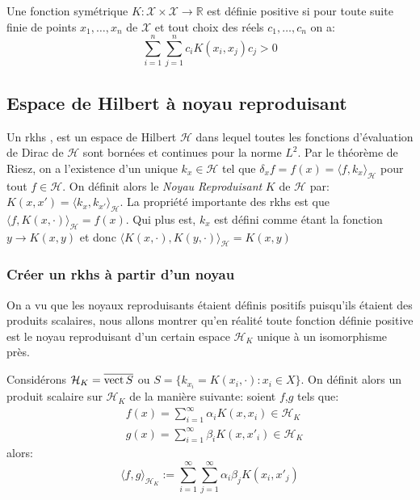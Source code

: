 \begin{definition}
Une fonction symétrique $K : \mathcal{X} \times \mathcal{X} \rightarrow \mathbb{R} $ est définie positive si pour toute suite finie de points $x_1,\dots,x_n$ de $\mathcal{X}$ et tout choix des réels $c_1,\dots, c_n$ on a:
\begin{equation*}
    \sum_{i=1}^n \sum_{j=1}^n c_i K(x_i,x_j) c_j > 0
\end{equation*}
\end{definition}

\subsection{Espace de Hilbert à noyau reproduisant}

Un \ac{rkhs} \citep{Aronszajn1950}, est un espace de Hilbert $\mathcal{H}$ dans lequel toutes les fonctions d'évaluation de Dirac de $\mathcal{H}$ sont bornées et continues pour la norme $L^2$. Par le théorème de Riesz, on a l'existence d'un unique $k_x \in \mathcal{H}$ tel que $\delta_x f = f(x) = \langle f, k_x \rangle_{\mathcal{H}}$ pour tout $f \in \mathcal{H}$. On définit alors le \textit{Noyau Reproduisant} $K$ de $\mathcal{H}$ par: $ K(x,x') = \langle k_x , k_{x'} \rangle_{\mathcal{H}} $. La propriété importante des \ac{rkhs} est que $ \langle f , K(x,\cdot) \rangle_{\mathcal{H}} = f(x)$. Qui plus est, $k_x$ est défini comme étant la fonction $ y \rightarrow K(x,y) $ et donc $ \langle K(x,\cdot), K(y,\cdot) \rangle_{\mathcal{H}} = K(x,y) $

\subsubsection{Créer un \ac{rkhs} à partir d'un noyau}

On a vu que les noyaux reproduisants étaient définis positifs puisqu'ils étaient des produits scalaires, nous allons montrer qu'en réalité toute fonction définie positive est le noyau reproduisant d'un certain espace $\mathcal{H}_K$ unique à un isomorphisme près.

Considérons $\mathcal{H}_K = \overline{\operatorname{vect} S} $ ou $ S = \{ k_{x_i} = K(x_i,\cdot) : x_i \in X \} $. On définit alors un produit scalaire sur $\mathcal{H}_K$ de la manière suivante: soient $f$,$g$ tels que:
\begin{align*}
    &f(x) = \sum_{i=1}^\infty \alpha_i K(x,x_i) \in \mathcal{H}_K \\
    &g(x) = \sum_{i=1}^{\infty} \beta_i K(x,x'_i) \in \mathcal{H}_K
\end{align*}
alors:
\begin{equation*}
    \langle f , g \rangle_{\mathcal{H}_K} :=  \sum_{i=1}^\infty \sum_{j=1}^{\infty} \alpha_i \beta_j K(x_i,x'_j)
\end{equation*}

